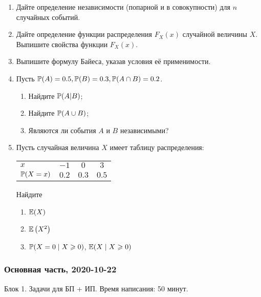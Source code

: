 \begin{enumerate}
\item Дайте определение независимости (попарной и в совокупности) для $n$ случайных событий.
\item Дайте определение функции распределения $F_{X}(x)$ случайной величины $X$. 
Выпишите свойства функции $F_{X}(x)$. 
\item Выпишите формулу Байеса, указав условия её применимости.

\item  Пусть $\P(A) = 0.5, \P(B) = 0.3, \P(A\cap B) = 0.2$.
\begin{enumerate}
  \item  Найдите $\P(A|B)$;
  \item  Найдите $\P(A\cup B)$;
  \item  Являются ли события $A$ и $B$ независимыми?
\end{enumerate}

\item  Пусть случайная величина $X$ имеет таблицу распределения: %

\begin{tabular}{lccc}
\toprule
$x$ & $-1$  & $0$  & $3$ \\
$\P(X = x)$ & $0.2$ & $0.3$  & $0.5$ \\
\bottomrule
\end{tabular}

Найдите
\begin{enumerate}
	\item $\E(X)$
	\item $\E\left(X^2\right)$
	\item $\P(X=0 \mid X \geq 0)$, $\E(X \mid X \geq 0)$
\end{enumerate}

\end{enumerate}

\subsubsection*{Основная часть, 2020-10-22}

Блок 1. Задачи для БП + ИП. Время написания: 50 минут. 

